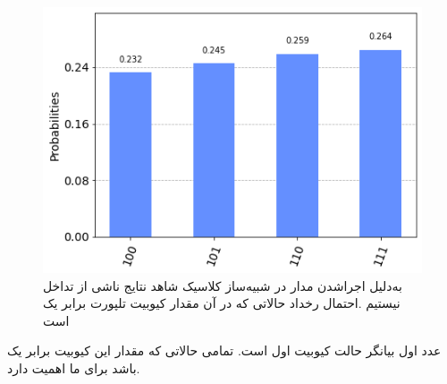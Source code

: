 \documentclass{book}
\begin{document}
\begin{center}
\begin{figure}[h]
\centering
\includegraphics[width=0.8\linewidth]{Teleport7.png}
\caption{به‌دلیل اجراشدن مدار در شبیه‌ساز کلاسیک شاهد نتایج ناشی از تداخل نیستیم .احتمال رخداد حالاتی که در آن مقدار کیوبیت تلپورت برابر یک است}
\end{figure}
\end{center}


عدد اول بیانگر حالت کیوبیت اول است. تمامی حالاتی که مقدار این کیوبیت برابر یک باشد برای ما اهمیت دارد.
\end{document}
